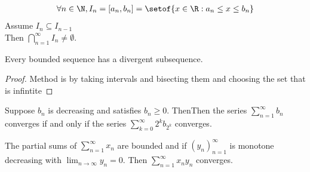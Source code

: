 \documentclass[answers,12pt,addpoints]{exam}
\begin{document}
\begin{definition}
    \begin{gather*}
        \forall n \in \N, I_n = [a_n, b_n] = \setof{x \in \R: a_n \leq x \leq b_n}\\
    \end{gather*}
    Assume $I_n \subseteq I_{n-1}$ \\
    Then $\bigcap_{n=1}^{\infty} I_n \neq \emptyset$.
\end{definition}
\begin{definition}
    Every bounded sequence has a divergent subsequence.\\
    \begin{proof}
        Method is by taking intervals and bisecting them and choosing the set that is infintite
    \end{proof}
\end{definition}
\begin{definition}
    
\end{definition}
\begin{definition}
    Suppose $b_n$ is decreasing and satisfies $b_n \geq 0$.
    ThenThen the series $\sum_{n=1}^{\infty} b_n$ converges if and only if the series $\sum_{k=0}^{\infty} 2^k b_{2^k}$ converges.
\end{definition}
\begin{definition}
    The partial sums of $\sum_{n=1}^{\infty} x_n$ are bounded and if $(y_n)_{n=1}^{\infty}$ is monotone decreasing with $\lim_{n \to \infty} y_n = 0$.
    Then $\sum_{n=1}^{\infty} x_n y_n$ converges.
\end{definition}
\end{document}
